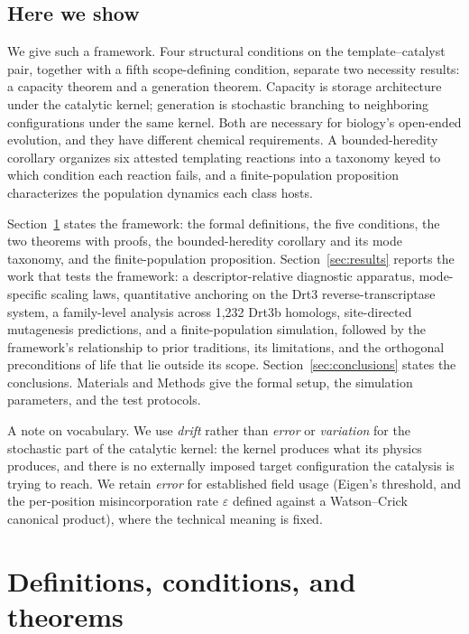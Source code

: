 \documentclass[aps,prx,reprint,amsmath,amssymb,floatfix,superscriptaddress,nofootinbib]{revtex4-2}
\theoremstyle{plain-thm}
\theoremstyle{definition-thm}
\begin{document}
\subsection{Here we show}

We give such a framework. Four structural conditions on the template--catalyst pair, together with a fifth scope-defining condition, separate two necessity results: a capacity theorem and a generation theorem. Capacity is storage architecture under the catalytic kernel; generation is stochastic branching to neighboring configurations under the same kernel. Both are necessary for biology's open-ended evolution, and they have different chemical requirements. A bounded-heredity corollary organizes six attested templating reactions into a taxonomy keyed to which condition each reaction fails, and a finite-population proposition characterizes the population dynamics each class hosts.

Section~\ref{sec:theory} states the framework: the formal definitions, the five conditions, the two theorems with proofs, the bounded-heredity corollary and its mode taxonomy, and the finite-population proposition. Section~\ref{sec:results} reports the work that tests the framework: a descriptor-relative diagnostic apparatus, mode-specific scaling laws, quantitative anchoring on the Drt3 reverse-transcriptase system, a family-level analysis across 1{,}232 Drt3b homologs, site-directed mutagenesis predictions, and a finite-population simulation, followed by the framework's relationship to prior traditions, its limitations, and the orthogonal preconditions of life that lie outside its scope. Section~\ref{sec:conclusions} states the conclusions. Materials and Methods give the formal setup, the simulation parameters, and the test protocols.

A note on vocabulary. We use \emph{drift} rather than \emph{error} or \emph{variation} for the stochastic part of the catalytic kernel: the kernel produces what its physics produces, and there is no externally imposed target configuration the catalysis is trying to reach. We retain \emph{error} for established field usage (Eigen's threshold, and the per-position misincorporation rate $\varepsilon$ defined against a Watson--Crick canonical product), where the technical meaning is fixed.


\section{Definitions, conditions, and theorems}
\label{sec:theory}
\end{document}
